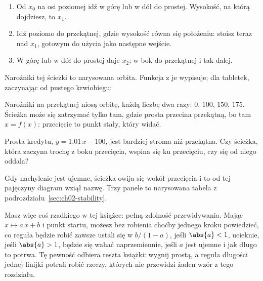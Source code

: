 \begin{enumerate}
\item Od $x_0$ na osi poziomej idź w górę lub w dół do prostej. Wysokość,
  na którą dojdziesz, to $x_1$.
\item Idź poziomo do przekątnej, gdzie wysokość równa się położeniu:
  stoisz teraz nad $x_1$, gotowym do użycia jako następne wejście.
\item W górę lub w dół do prostej daje $x_2$; w bok do przekątnej i tak
  dalej.
\end{enumerate}

\noindent
Narożniki tej ścieżki to narysowana orbita. Funkcja  z
 je wypisuje; dla tabletek, zaczynając od pustego krwiobiegu:



\noindent
Narożniki na przekątnej niosą orbitę, każdą liczbę dwa razy: $0$, $100$,
$150$, $175$. Ścieżka może się zatrzymać tylko tam, gdzie prosta przecina
przekątną, bo tam $x = f(x)$: przecięcie to punkt stały, który widać.

\begin{think}
Prosta kredytu, $y = \num{1.01}\,x - 100$, jest bardziej stroma niż
przekątna. Czy ścieżka, która zaczyna trochę z boku przecięcia, wspina się
ku przecięciu, czy się od niego oddala?
\end{think}


\noindent
Gdy nachylenie jest ujemne, ścieżka owija się wokół przecięcia i to od tej
pajęczyny diagram wziął nazwę. Trzy panele to narysowana tabela z
podrozdziału~\ref{sec:ch02-stability}.

Masz więc coś rzadkiego w tej książce: pełną zdolność przewidywania. Mając
$x \mapsto a\,x + b$ i punkt startu, możesz bez robienia choćby jednego
kroku powiedzieć, co reguła będzie robić zawsze \dash{} ustali się w
$b/(1 - a)$, jeśli $\abs{a} < 1$, ucieknie, jeśli $\abs{a} > 1$, będzie się
wahać naprzemiennie, jeśli $a$ jest ujemne \dash{} i jak długo to potrwa.
Tę pewność odbiera reszta książki: wygnij prostą, a reguła długości jednej
linijki potrafi robić rzeczy, których nie przewidzi żaden wzór z tego
rozdziału.

